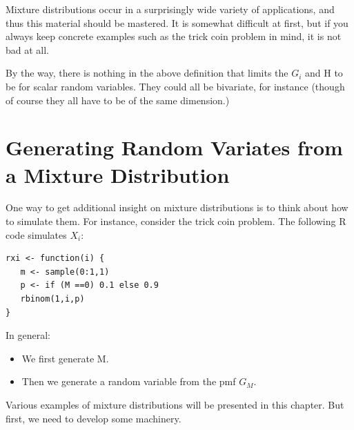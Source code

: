 \documentclass[11pt]{article}
\begin{document}
Mixture distributions occur in a surprisingly wide variety of
applications, and thus this material should be mastered.  It is somewhat
difficult at first, but if you always keep concrete examples such as the
trick coin problem in mind, it is not bad at all.

By the way, there is nothing in the above definition that limits the
$G_i$ and H to be for scalar random variables.  They could all be
bivariate, for instance (though of course they all have to be of the
same dimension.)

\section{Generating Random Variates from a Mixture Distribution}

One way to get additional insight on mixture distributions is to think
about how to simulate them.  For instance, consider the trick coin problem.
The following R code simulates $X_i$:

\begin{lstlisting}
rxi <- function(i) {
   m <- sample(0:1,1)
   p <- if (M ==0) 0.1 else 0.9
   rbinom(1,i,p)
}
\end{lstlisting}

In general:

\begin{itemize}

\item We first generate M.

\item Then we generate a random variable from the pmf $G_M$.

\end{itemize}

Various examples of mixture distributions will be presented in this
chapter.  But first, we need to develop some machinery.
\end{document}
